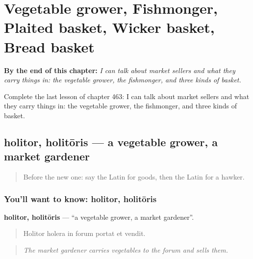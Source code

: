 
\chapter{Vegetable grower, Fishmonger, Plaited basket, Wicker basket, Bread basket}
\label{ch:la-vegetable-grower-fishmonger-plaited-basket-wicker-basket-bread-basket}

\begin{chapteropening}
\textbf{By the end of this chapter:} \emph{I can talk about market sellers and what they carry things in: the vegetable grower, the fishmonger, and three kinds of basket.}

Complete the last lesson of chapter 463: I can talk about market sellers and what they carry things in: the vegetable grower, the fishmonger, and three kinds of basket.
\end{chapteropening}

\section[holitor, holitōris]{holitor, holitōris — a vegetable grower, a market gardener}

\label{lesson:LA-C463-holitor}



\begin{quote}
Before the new one: say the Latin for goods, then the Latin for a hawker.
\end{quote}

\subsection*{You'll want to know: holitor, holitōris}
\textbf{holitor, holitōris} — \textquotedblleft{}a vegetable grower, a market gardener\textquotedblright{}.

\begin{quote}
Holitor holera in forum portat et vendit.
\end{quote}

\begin{quote}
\emph{The market gardener carries vegetables to the forum and sells them.}
\end{quote}

